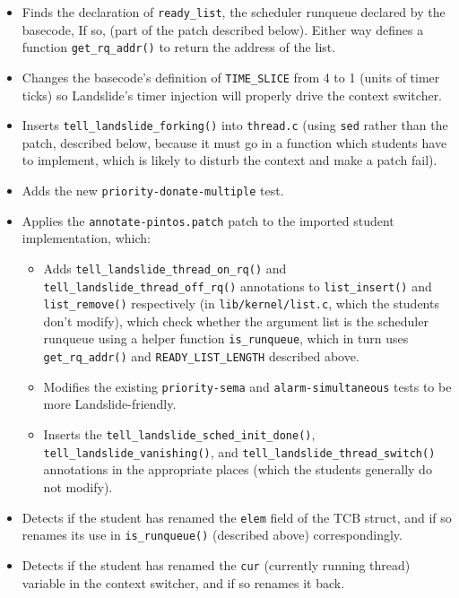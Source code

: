 \begin{itemize}
	\item Finds the declaration of {\tt ready\_list}, the scheduler runqueue declared by the basecode,
		If so,
		(part of the patch described below).
		Either way defines a function {\tt get\_rq\_addr()} to return the address of the %
		list.
	\item Changes the basecode's definition of {\tt TIME\_SLICE} from 4 to 1 (units of timer ticks)
		so Landslide's timer injection will properly drive the context switcher.
	\item Inserts {\tt tell\_landslide\_forking()} into {\tt thread.c}
		(using {\tt sed} rather than the patch, described below,
		because it must go in a function which students have to implement,
		which is likely to disturb the context and make a patch fail).
	\item Adds the new {\tt priority-donate-multiple} test.
	\item Applies the {\tt annotate-pintos.patch} patch to the imported student implementation, which:
	\begin{itemize}
		\item Adds {\tt tell\_landslide\_thread\_on\_rq()}
			and {\tt tell\_landslide\_thread\_off\_rq()}
			annotations
			to {\tt list\_insert()} and {\tt list\_remove()} respectively
			(in {\tt lib/kernel/\allowbreak{}list.c}, which the students don't modify),
			which
			check whether the argument list
			is the scheduler runqueue
			using a helper function {\tt is\_runqueue},
			which in turn uses {\tt get\_rq\_addr()} and {\tt READY\_LIST\_LENGTH} described above.
		\item Modifies the existing {\tt priority-sema} and {\tt alarm-simultaneous} tests to be more Landslide-friendly.
		\item Inserts the {\tt tell\_landslide\_sched\_init\_done()},
			{\tt tell\_landslide\_vanishing()},
			and {\tt tell\_landslide\_thread\_switch()}
			annotations in the appropriate places
			(which the students generally do not modify).
	\end{itemize}
	\item Detects if the student has renamed the {\tt elem} field of the TCB struct,
		and if so renames its use in {\tt is\_runqueue()} (described above) correspondingly.
	\item Detects if the student has renamed the {\tt cur} (currently running thread) variable
		in the context switcher, and if so renames it back.
\end{itemize}

